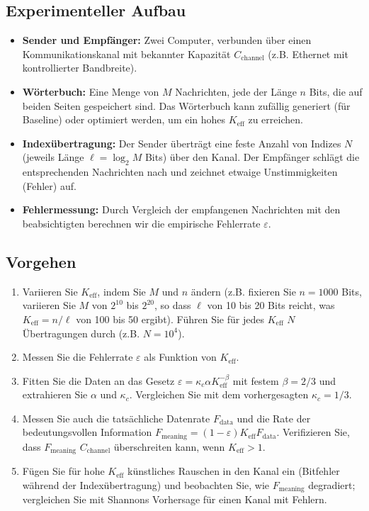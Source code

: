 \documentclass[12pt,a4paper]{article}
\theoremstyle{remark}
\newcommand{\Keff}{K_{\mathrm{eff}}}
\begin{document}
	\subsection{Experimenteller Aufbau}
	
	\begin{itemize}
		\item \textbf{Sender und Empfänger:} Zwei Computer, verbunden über einen Kommunikationskanal mit bekannter Kapazität $C_{\text{channel}}$ (z.B. Ethernet mit kontrollierter Bandbreite).
		\item \textbf{Wörterbuch:} Eine Menge von $M$ Nachrichten, jede der Länge $n$ Bits, die auf beiden Seiten gespeichert sind. Das Wörterbuch kann zufällig generiert (für Baseline) oder optimiert werden, um ein hohes $\Keff$ zu erreichen.
		\item \textbf{Indexübertragung:} Der Sender überträgt eine feste Anzahl von Indizes $N$ (jeweils Länge $\ell = \log_2 M$ Bits) über den Kanal. Der Empfänger schlägt die entsprechenden Nachrichten nach und zeichnet etwaige Unstimmigkeiten (Fehler) auf.
		\item \textbf{Fehlermessung:} Durch Vergleich der empfangenen Nachrichten mit den beabsichtigten berechnen wir die empirische Fehlerrate $\varepsilon$.
	\end{itemize}
	
	\subsection{Vorgehen}
	
	\begin{enumerate}
		\item Variieren Sie $\Keff$, indem Sie $M$ und $n$ ändern (z.B. fixieren Sie $n=1000$ Bits, variieren Sie $M$ von $2^{10}$ bis $2^{20}$, so dass $\ell$ von 10 bis 20 Bits reicht, was $\Keff = n/\ell$ von 100 bis 50 ergibt). Führen Sie für jedes $\Keff$ $N$ Übertragungen durch (z.B. $N=10^4$).
		\item Messen Sie die Fehlerrate $\varepsilon$ als Funktion von $\Keff$.
		\item Fitten Sie die Daten an das Gesetz $\varepsilon = \kappa_c \alpha K_{\mathrm{eff}}^{-\beta}$ mit festem $\beta=2/3$ und extrahieren Sie $\alpha$ und $\kappa_c$. Vergleichen Sie mit dem vorhergesagten $\kappa_c=1/3$.
		\item Messen Sie auch die tatsächliche Datenrate $F_{\text{data}}$ und die Rate der bedeutungsvollen Information $F_{\text{meaning}} = (1-\varepsilon) \Keff F_{\text{data}}$. Verifizieren Sie, dass $F_{\text{meaning}}$ $C_{\text{channel}}$ überschreiten kann, wenn $\Keff>1$.
		\item Fügen Sie für hohe $\Keff$ künstliches Rauschen in den Kanal ein (Bitfehler während der Indexübertragung) und beobachten Sie, wie $F_{\text{meaning}}$ degradiert; vergleichen Sie mit Shannons Vorhersage für einen Kanal mit Fehlern.
	\end{enumerate}
	
\end{document}
